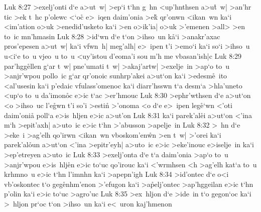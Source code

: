\vs Luk 8:27
>exelj'onti
d`e
a>ut~w|
>ep`i
t`hn
g~hn
<up'hnthsen
a>u\r{t}~w|
>an'hr
tic
>ek
t~hc
p'olewc
<`oc\r{}
e>~iqen
daim'onia
>ek\r{}
qr'onwn
<ikan~wn
ka`i
<im'ation
o>uk
>enedid'usketo
ka`i
>en
o>ik'ia|
o>uk
>'emenen
>all>
>en
to~ic
mn'hmasin\bibvsend
\vs Luk 8:28
>id`wn
d`e
t`on
>ihso~un
k\r{a}`i
>anakr'axac
pros'epesen
a>ut~w|
ka`i
vfwn~h|
meg'alh|
e>~ipen
t'i
>emo`i
ka`i
so`i
>ihso~u
u<i`e
to~u
vjeo~u
to~u
<uy'istou
d'eoma'i
sou
m'h
me
vbasan'ish|c\bibvsend
\vs Luk 8:29
par'hgg\r{e}llen
g`ar
t~w|
pne'umati
t~w|
>akaj'artw|
>exelje~in
>ap`o
to~u
>anjr'wpou
pollo~ic
g`ar
qr'onoic
sunhrp'akei
a>ut`on
ka`i
>edesm\r{e}~ito
<al'usesin
ka`i
p'edaic
vfulass'omenoc
ka`i
diarr'hsswn
t`a
desm`a
>hla'uneto
<up`o
to~u
da'imon\r{o}c
e>ic
t`ac
>er'hmouc\bibvsend
\vs Luk 8:30
>ephr'wthsen
d`e
a>ut`on
<o
>ihso~uc
l'e\r{g}wn
t'i
so'i
>estin\r{}
>'onoma
<o
d`e
e>~ipen
leg\r{e}`wn
<'oti
daim'onia\r{}
poll`a
e>is~hljen
e>ic
a>ut'on\bibvsend
\vs Luk 8:31
ka`i
parek'al\r{e}i
a>ut`on
<'ina
m`h
>epit'axh|
a>uto~ic
e>ic
t`hn
>'abusson
>apelje~in\bibvsend
\vs Luk 8:32
>~hn
d`e
>eke~i
>ag'elh
qo'irwn
<ikan~wn
vboskom'en\r{w}n
>en
t~w|
>'orei
ka`i
parek'al\r{o}un
a>ut`on
<'ina
>epitr'eyh|
a>uto~ic
e>ic
>eke'inouc
e>iselje~in
ka`i
>ep'etreyen
a>uto~ic\bibvsend
\vs Luk 8:33
>exelj'onta
d`e
t`a
daim'onia
>ap`o
to~u
>anjr'wpou
e>is~hlj\r{e}n
e>ic
to`uc
qo'irouc
ka`i
<'wrmhsen
<h
>ag'elh
kat`a
to~u
krhmno~u
e>ic
t`hn
l'imnhn
ka`i
>apepn'igh\bibvsend
\vs Luk 8:34
>id'ontec
d`e
o<i
vb'oskontec
t`o
geg\r{e}nhm'enon
>'efugon
ka`i
>a\r{p}elj'ontec
>ap'hggeilan
e>ic
t`hn
p'olin
ka`i
e>ic
to`uc
>agro'uc\bibvsend
\vs Luk 8:35
>ex~hljon
d`e
>ide~in
t`o
gegon`oc
ka`i
>~hljon
pr`oc
t`on
>ihso~un
ka`i
e<~uron
kaj'hmenon

